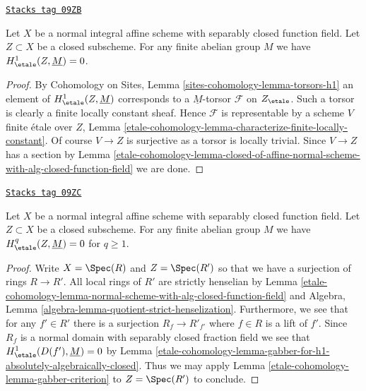\begin{lemma}
\label{etale-cohomology-lemma-gabber-for-h1-absolutely-algebraically-closed}
\href{https://stacks.math.columbia.edu/tag/09ZB}{\texttt{Stacks tag 09ZB}}

Let $X$ be a normal integral affine scheme with separably closed
function field. Let $Z \subset X$ be a closed subscheme.
For any finite abelian group $M$ we have $H^1_\etale(Z, \underline{M}) = 0$.
\end{lemma}

\begin{proof}
By Cohomology on Sites, Lemma \ref{sites-cohomology-lemma-torsors-h1}
an element of $H^1_\etale(Z, \underline{M})$ corresponds to a
$\underline{M}$-torsor $\mathcal{F}$ on $Z_\etale$.
Such a torsor is clearly a finite locally constant sheaf.
Hence $\mathcal{F}$ is representable by a scheme $V$ finite
\'etale over $Z$, Lemma \ref{etale-cohomology-lemma-characterize-finite-locally-constant}.
Of course $V \to Z$ is surjective as a torsor is locally trivial.
Since $V \to Z$ has a section by
Lemma \ref{etale-cohomology-lemma-closed-of-affine-normal-scheme-with-alg-closed-function-field}
we are done.
\end{proof}

\begin{lemma}
\label{etale-cohomology-lemma-gabber-for-absolutely-algebraically-closed}
\href{https://stacks.math.columbia.edu/tag/09ZC}{\texttt{Stacks tag 09ZC}}

Let $X$ be a normal integral affine scheme with separably closed
function field. Let $Z \subset X$ be a closed subscheme.
For any finite abelian group $M$ we have
$H^q_\etale(Z, \underline{M}) = 0$ for $q \geq 1$.
\end{lemma}

\begin{proof}
Write $X = \Spec(R)$ and $Z = \Spec(R')$ so that we have a surjection
of rings $R \to R'$. All local rings of $R'$ are strictly henselian by
Lemma \ref{etale-cohomology-lemma-normal-scheme-with-alg-closed-function-field} and
Algebra, Lemma \ref{algebra-lemma-quotient-strict-henselization}.
Furthermore, we see that for any $f' \in R'$ there is a surjection
$R_f \to R'_{f'}$ where $f \in R$ is a lift of $f'$.
Since $R_f$ is a normal domain with separably closed fraction field
we see that $H^1_\etale(D(f'), \underline{M}) = 0$ by
Lemma \ref{etale-cohomology-lemma-gabber-for-h1-absolutely-algebraically-closed}.
Thus we may apply Lemma \ref{etale-cohomology-lemma-gabber-criterion} to $Z = \Spec(R')$
to conclude.
\end{proof}


